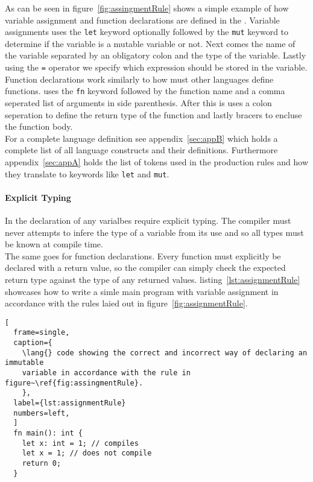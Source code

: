 As can be seen in figure~\ref{fig:assingmentRule} shows a simple example of how
variable assignment and function declarations are defined in the \lang. Variable
assignments uses the
\texttt{let} keyword optionally followed by the \texttt{mut} keyword to determine if
the variable is a mutable variable or not. Next comes the name of the variable
separated by an obligatory colon and the type of the variable. Lastly using the
\texttt{=} operator we specify which expression should be stored in the variable. \\

Function declarations work similarly to how must other languages define functions.
\lang{} uses the \texttt{fn} keyword followed by the function name and a comma
seperated list of arguments in side parenthesis. After this is uses a colon
seperation to define the return type of the function and lastly bracers to encluse
the function body. \\

For a complete language definition see appendix~\ref{sec:appB} which holds a
complete list of all language constructs and their definitions. Furthermore
appendix~\ref{sec:appA} holds the list of tokens used in the production rules and how
they translate to keywords like \texttt{let} and \texttt{mut}.


\paragraph{Explicit Typing} \hfill
\vspace{0.1em}

In \lang{} the declaration of any varialbes require explicit typing. The compiler
must never attempts to infere the type of a variable from its use and so all types
must be known at compile time.\\

The same goes for function declarations. Every function must explicitly be declared
with a return value, so the compiler can simply check the expected return type
against the type of any returned values. listing~\ref{lst:assignmentRule} showcases
how to write a simle main program with variable assignment in accordance with the
rules laied out in figure~\ref{fig:assignmentRule}.

\begin{lstlisting}[
  frame=single,
  caption={
    \lang{} code showing the correct and incorrect way of declaring an immutable
    variable in accordance with the rule in figure~\ref{fig:assingmentRule}.
    },
  label={lst:assignmentRule}
  numbers=left,
  ]
  fn main(): int {
    let x: int = 1; // compiles
    let x = 1; // does not compile
    return 0;
  }
\end{lstlisting}

